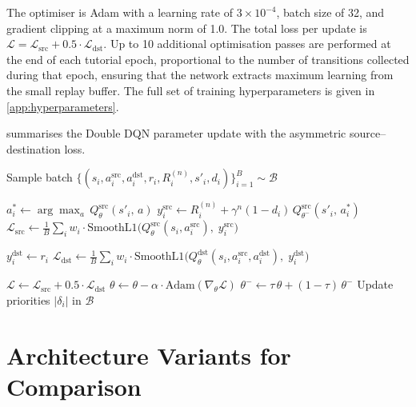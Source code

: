 The optimiser is Adam with a learning rate of $3 \times 10^{-4}$, batch size of 32, and gradient clipping at a maximum norm of 1.0. The total loss per update is $\mathcal{L} = \mathcal{L}_\text{src} + 0.5 \cdot \mathcal{L}_\text{dst}$. Up to 10 additional optimisation passes are performed at the end of each tutorial epoch, proportional to the number of transitions collected during that epoch, ensuring that the network extracts maximum learning from the small replay buffer. The full set of training hyperparameters is given in \cref{app:hyperparameters}.

 summarises the Double DQN parameter update with the asymmetric source--destination loss.

\begin{algorithm}[H]
\caption{Double DQN Training Update (Single Batch)}
\label{alg:training_update}
\DontPrintSemicolon
{}

Sample batch $\{(s_i, a^\text{src}_i, a^\text{dst}_i, r_i, R^{(n)}_i, s'_i, d_i)\}_{i=1}^{B} \sim \mathcal{B}$\;

\BlankLine
{}
$a^*_i \leftarrow \arg\max_a\, Q_\theta^\text{src}(s'_i,\, a)$ 
$y_i^\text{src} \leftarrow R^{(n)}_i + \gamma^n (1 - d_i)\, Q_{\theta^-}^\text{src}(s'_i,\, a^*_i)$ 
$\mathcal{L}_\text{src} \leftarrow \frac{1}{B} \sum_i w_i \cdot \text{SmoothL1}\!\bigl(Q_\theta^\text{src}(s_i, a_i^\text{src}),\; y_i^\text{src}\bigr)$\;

\BlankLine
{}
$y_i^\text{dst} \leftarrow r_i$ 
$\mathcal{L}_\text{dst} \leftarrow \frac{1}{B} \sum_i w_i \cdot \text{SmoothL1}\!\bigl(Q_\theta^\text{dst}(s_i, a_i^\text{src}, a_i^\text{dst}),\; y_i^\text{dst}\bigr)$\;

\BlankLine
$\mathcal{L} \leftarrow \mathcal{L}_\text{src} + 0.5 \cdot \mathcal{L}_\text{dst}$\;
$\theta \leftarrow \theta - \alpha \cdot \text{Adam}(\nabla_\theta \mathcal{L})$ 
$\theta^- \leftarrow \tau\, \theta + (1 - \tau)\, \theta^-$ 
Update priorities $|\delta_i|$ in $\mathcal{B}$\;
\end{algorithm}

\section{Architecture Variants for Comparison}
\label{sec:agent:variants}

